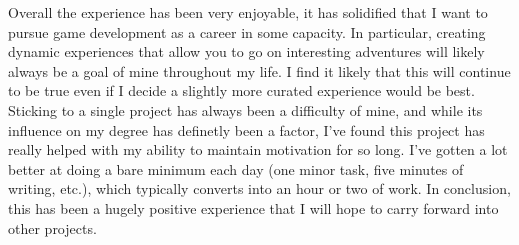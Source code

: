 \documentclass{report}
\begin{document}
Overall the experience has been very enjoyable, it has solidified that I want to pursue game development as a career in some capacity. In particular, creating dynamic experiences that allow you to go on interesting adventures will likely always be a goal of mine throughout my life. I find it likely that this will continue to be true even if I decide a slightly more curated experience would be best. Sticking to a single project has always been a difficulty of mine, and while its influence on my degree has definetly been a factor, I've found this project has really helped with my ability to maintain motivation for so long. I've gotten a lot better at doing a bare minimum each day (one minor task, five minutes of writing, etc.), which typically converts into an hour or two of work.
In conclusion, this has been a hugely positive experience that I will hope to carry forward into other projects.
\end{document}
